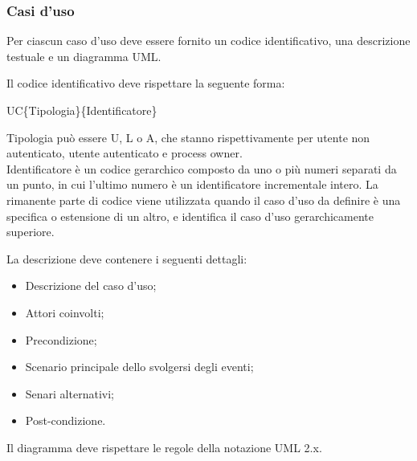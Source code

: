 \subsubsection{Casi d'uso}
Per ciascun caso d'uso deve essere fornito un codice identificativo, una descrizione testuale e un diagramma UML.

\begin{flushleft}
Il codice identificativo deve rispettare la seguente forma:
\end{flushleft}

\begin{center}UC\{Tipologia\}\{Identificatore\}\end{center}
Tipologia può essere U, L o A, che stanno rispettivamente per utente non autenticato, utente autenticato e process owner.\\
Identificatore è un codice gerarchico composto da uno o più numeri separati da un punto, in cui l'ultimo numero è un identificatore incrementale intero.
La rimanente parte di codice viene utilizzata quando il caso d'uso da definire è una specifica o estensione di un altro, e identifica il caso d'uso gerarchicamente superiore.

\begin{flushleft}
La descrizione deve contenere i seguenti dettagli:
\end{flushleft}

\begin{itemize}
\item Descrizione del caso d'uso;
\item Attori coinvolti;
\item Precondizione;
\item Scenario principale dello svolgersi degli eventi;
\item Senari alternativi;
\item Post-condizione.
\end{itemize}

\begin{flushleft}
Il diagramma deve rispettare le regole della notazione UML 2.x.
\end{flushleft}